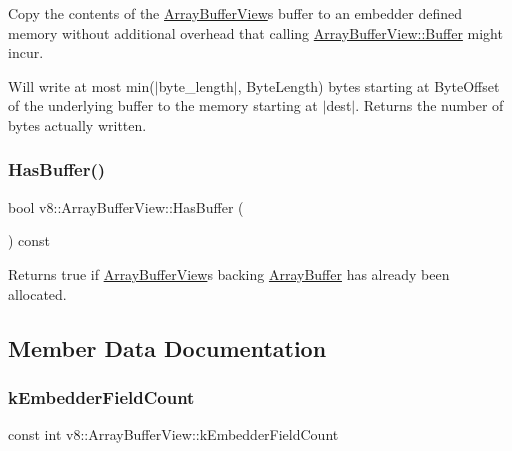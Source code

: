 Copy the contents of the \mbox{\hyperlink{classv8_1_1ArrayBufferView}{Array\+Buffer\+View}}\textquotesingle{}s buffer to an embedder defined memory without additional overhead that calling \mbox{\hyperlink{classv8_1_1ArrayBufferView_a2ceba3908fbf98ecc81702083127b046}{Array\+Buffer\+View\+::\+Buffer}} might incur.

Will write at most min($\vert$byte\+\_\+length$\vert$, Byte\+Length) bytes starting at Byte\+Offset of the underlying buffer to the memory starting at $\vert$dest$\vert$. Returns the number of bytes actually written. \mbox{\label{classv8_1_1ArrayBufferView_ab1f5835c3dea53a625814a8c3ab2e0ae}} 
\subsubsection{\texorpdfstring{Has\+Buffer()}{HasBuffer()}}
{\footnotesize\ttfamily bool v8\+::\+Array\+Buffer\+View\+::\+Has\+Buffer (\begin{DoxyParamCaption}{ }\end{DoxyParamCaption}) const}

Returns true if \mbox{\hyperlink{classv8_1_1ArrayBufferView}{Array\+Buffer\+View}}\textquotesingle{}s backing \mbox{\hyperlink{classv8_1_1ArrayBuffer}{Array\+Buffer}} has already been allocated. 

\subsection{Member Data Documentation}
\mbox{\label{classv8_1_1ArrayBufferView_a4c007c4f644125cee1b7605c9ea1bc6c}} 
\subsubsection{\texorpdfstring{k\+Embedder\+Field\+Count}{kEmbedderFieldCount}}
{\footnotesize\ttfamily const int v8\+::\+Array\+Buffer\+View\+::k\+Embedder\+Field\+Count\hspace{0.3cm}{\ttfamily [static]}}

